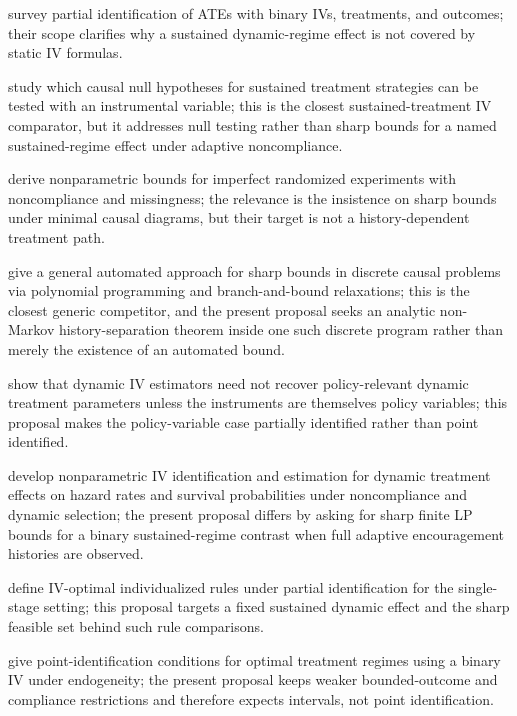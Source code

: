 \documentclass[11pt]{article}
\theoremstyle{definition}
\theoremstyle{plain}
\theoremstyle{remark}
\begin{document}
\citet{SwansonHernanMillerRobinsRichardson2018} survey partial identification of ATEs with binary IVs, treatments, and outcomes; their scope clarifies why a sustained dynamic-regime effect is not covered by static IV formulas.

\citet{SwansonLabrecqueHernan2018} study which causal null hypotheses for sustained treatment strategies can be tested with an instrumental variable; this is the closest sustained-treatment IV comparator, but it addresses null testing rather than sharp bounds for a named sustained-regime effect under adaptive noncompliance.

\citet{GabrielSjolanderSachs2023} derive nonparametric bounds for imperfect randomized experiments with noncompliance and missingness; the relevance is the insistence on sharp bounds under minimal causal diagrams, but their target is not a history-dependent treatment path.

\citet{DuarteFinkelsteinKnoxMummoloShpitser2024} give a general automated approach for sharp bounds in discrete causal problems via polynomial programming and branch-and-bound relaxations; this is the closest generic competitor, and the present proposal seeks an analytic non-Markov history-separation theorem inside one such discrete program rather than merely the existence of an automated bound.

\citet{HeckmanHumphriesVeramendi2016} show that dynamic IV estimators need not recover policy-relevant dynamic treatment parameters unless the instruments are themselves policy variables; this proposal makes the policy-variable case partially identified rather than point identified.

\citet{VanDenBergBonevMammen2020} develop nonparametric IV identification and estimation for dynamic treatment effects on hazard rates and survival probabilities under noncompliance and dynamic selection; the present proposal differs by asking for sharp finite LP bounds for a binary sustained-regime contrast when full adaptive encouragement histories are observed.

\citet{PuZhang2021} define IV-optimal individualized rules under partial identification for the single-stage setting; this proposal targets a fixed sustained dynamic effect and the sharp feasible set behind such rule comparisons.

\citet{CuiTchetgen2021} give point-identification conditions for optimal treatment regimes using a binary IV under endogeneity; the present proposal keeps weaker bounded-outcome and compliance restrictions and therefore expects intervals, not point identification.
\end{document}
